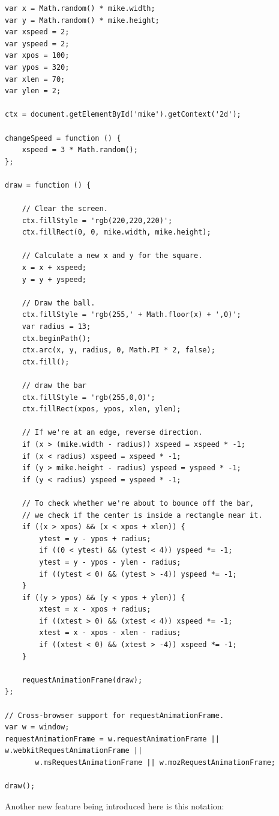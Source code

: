 \documentclass[11pt]{article}
\begin{document}
\begin{verbatim}
var x = Math.random() * mike.width;
var y = Math.random() * mike.height;
var xspeed = 2;
var yspeed = 2;
var xpos = 100;
var ypos = 320;
var xlen = 70;
var ylen = 2;

ctx = document.getElementById('mike').getContext('2d');

changeSpeed = function () {
    xspeed = 3 * Math.random();
};

draw = function () {

    // Clear the screen.
    ctx.fillStyle = 'rgb(220,220,220)';
    ctx.fillRect(0, 0, mike.width, mike.height);

    // Calculate a new x and y for the square.
    x = x + xspeed;
    y = y + yspeed;

    // Draw the ball.
    ctx.fillStyle = 'rgb(255,' + Math.floor(x) + ',0)';
    var radius = 13;
    ctx.beginPath();
    ctx.arc(x, y, radius, 0, Math.PI * 2, false);
    ctx.fill();

    // draw the bar
    ctx.fillStyle = 'rgb(255,0,0)';
    ctx.fillRect(xpos, ypos, xlen, ylen);

    // If we're at an edge, reverse direction.
    if (x > (mike.width - radius)) xspeed = xspeed * -1;
    if (x < radius) xspeed = xspeed * -1;
    if (y > mike.height - radius) yspeed = yspeed * -1;
    if (y < radius) yspeed = yspeed * -1;

    // To check whether we're about to bounce off the bar,
    // we check if the center is inside a rectangle near it.
    if ((x > xpos) && (x < xpos + xlen)) {
        ytest = y - ypos + radius;
        if ((0 < ytest) && (ytest < 4)) yspeed *= -1;
        ytest = y - ypos - ylen - radius;
        if ((ytest < 0) && (ytest > -4)) yspeed *= -1;
    }
    if ((y > ypos) && (y < ypos + ylen)) {
        xtest = x - xpos + radius;
        if ((xtest > 0) && (xtest < 4)) xspeed *= -1;
        xtest = x - xpos - xlen - radius;
        if ((xtest < 0) && (xtest > -4)) xspeed *= -1;
    }

    requestAnimationFrame(draw);
};

// Cross-browser support for requestAnimationFrame.
var w = window;
requestAnimationFrame = w.requestAnimationFrame || w.webkitRequestAnimationFrame ||
       w.msRequestAnimationFrame || w.mozRequestAnimationFrame;

draw();
\end{verbatim}

Another new feature being introduced here is this notation:
\end{document}
